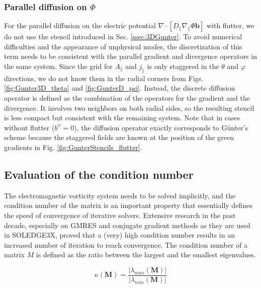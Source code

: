 \subsubsection{Parallel diffusion on $\Phi$}
For the parallel diffusion on the electric potential $\nabla \cdot \left[ D_\parallel \nabla_\parallel \Phi \mathbf{b} \right]$ with flutter, we do not use the stencil introduced in Sec. \ref{ssec:3DGunter}. To avoid numerical difficulties and the appearance of unphysical modes, the discretization of this term needs to be consistent with the parallel gradient and divergence operators in the same system. Since the grid for $A_\parallel$ and $j_\parallel$ is only staggered in the $\theta$ and $\varphi$ directions, we do not know them in the radial corners from Figs. \ref{fig:Gunter3D_theta} and \ref{fig:GunterD_psi}. Instead, the discrete diffusion operator is defined as the combination of the operators for the gradient and the divergence. It involves two neighbors on both radial sides, so the resulting stencil is less compact but consistent with the remaining system. Note that in cases without flutter ($b^\psi = 0$), the diffusion operator exactly corresponds to Günter's scheme \cite{gunter2005} because the staggered fields are known at the position of the green gradients in Fig. \ref{fig:GunterStencils_flutter}. \newline




\subsection{Evaluation of the condition number}

The electromagnetic vorticity system needs to be solved implicitly, and the condition number of the matrix is an important property that essentially defines the speed of convergence of iterative solvers. Extensive research in the past decade\cite{pyzara2011influence, strakos1991linear, drkovsova1995numerical, greenbaum1997numerical}, especially on GMRES and conjugate gradient methods as they are used in SOLEDGE3X, proved that a (very) high condition number results in an increased number of iteration to reach convergence. The condition number of a matrix $M$ is defined as the ratio between the largest and the smallest eigenvalues. 

\begin{equation}
	\label{eq:Impl_defConditionNumber}
	\kappa\left(\textbf{M}\right) = \frac{\left|\lambda_{max}(\textbf{M})\right|}{\left|\lambda_{min}(\textbf{M})\right|}
\end{equation}

